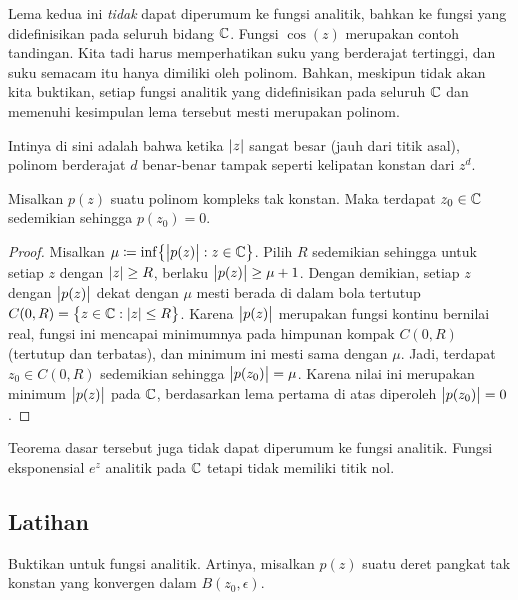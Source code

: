 Lema kedua ini \emph{tidak} dapat diperumum ke fungsi
analitik, bahkan ke fungsi yang didefinisikan pada seluruh bidang ${\mathbb{C}}$.  Fungsi
$\cos(z)$ merupakan contoh tandingan.
Kita tadi harus memperhatikan
suku yang berderajat tertinggi, dan suku semacam itu hanya dimiliki oleh
polinom.  Bahkan, meskipun tidak akan kita buktikan, setiap fungsi analitik
yang didefinisikan pada seluruh ${\mathbb{C}}$ dan memenuhi kesimpulan lema tersebut
mesti merupakan polinom.

Intinya di sini adalah bahwa ketika $\lvert {z} \rvert$ sangat besar (jauh dari
titik asal), polinom berderajat $d$ benar-benar tampak seperti kelipatan konstan
dari $z^d$.

\begin{thm}
%
Misalkan $p(z)$ suatu polinom kompleks tak konstan.  Maka terdapat $z_0 \in {\mathbb{C}}$
sedemikian sehingga $p(z_0) = 0$.
\end{thm}

\begin{proof}
Misalkan $\mu \coloneqq \inf \bigl\{ \bigl\lvert {p(z)} \bigr\rvert : z \in {\mathbb{C}} \bigr\}$.  Pilih $R$ sedemikian sehingga
untuk setiap $z$ dengan $\lvert {z} \rvert \geq R$, berlaku $\bigl\lvert {p(z)} \bigr\rvert \geq \mu+1$.
Dengan demikian, setiap $z$ dengan $\bigl\lvert {p(z)} \bigr\rvert$ dekat dengan $\mu$ mesti berada di dalam
bola tertutup $C(0,R) = \bigl\{ z \in {\mathbb{C}} : \lvert {z} \rvert \leq R \bigr\}$.  Karena $\bigl\lvert {p(z)} \bigr\rvert$
merupakan fungsi kontinu bernilai real, fungsi ini mencapai minimumnya
pada himpunan kompak $C(0,R)$ (tertutup dan terbatas), dan minimum ini mesti
sama dengan $\mu$.  Jadi, terdapat $z_0 \in C(0,R)$ sedemikian sehingga $\bigl\lvert {p(z_0)} \bigr\rvert = \mu$.
Karena nilai ini merupakan minimum $\bigl\lvert {p(z)} \bigr\rvert$ pada ${\mathbb{C}}$, berdasarkan lema pertama
di atas diperoleh $\bigl\lvert {p(z_0)} \bigr\rvert = 0$.
\end{proof}

Teorema dasar tersebut juga tidak dapat diperumum ke fungsi analitik.  Fungsi
eksponensial $e^{z}$ analitik pada ${\mathbb{C}}$ tetapi tidak memiliki titik nol.

\subsection{Latihan}

\begin{exercise} \label{exercise:minprinciple}
Buktikan  untuk fungsi analitik.  Artinya,
misalkan $p(z)$ suatu deret pangkat tak konstan yang konvergen dalam
$B(z_0,\epsilon)$.
\end{exercise}

